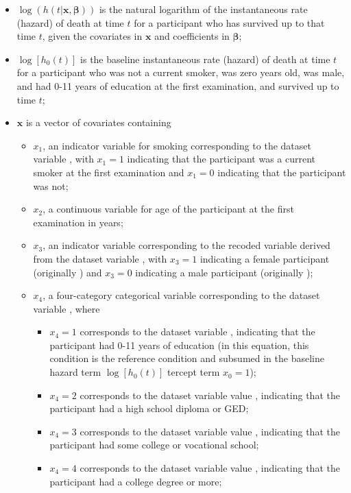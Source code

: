 \documentclass{article}\usepackage[]{graphicx}\usepackage[]{color}
\begin{document}
\begin{itemize}

  \item $ \log(h(t|\mathbf{x}, \bm{\beta})) $ is the natural logarithm of the instantaneous rate (hazard) of death at time $t$ for a participant who has survived up to that time $t$, given the covariates in $ \mathbf{x} $ and coefficients in $\bm{\beta}$;
  \item $\log[h_0(t)]$ is the baseline instantaneous rate (hazard) of death at time $t$ for a participant who was not a current smoker, was zero years old, was male, and had 0-11 years of education at the first examination, and survived up to time $t$;
  \item $\mathbf{x}$ is a vector of covariates containing
    \begin{itemize}
      \item $x_1$, an indicator variable for smoking corresponding to the dataset variable , with $x_1 = 1$ indicating that the participant was a current smoker at the first examination and $x_1 = 0$ indicating that the participant was not;
      \item $x_2$, a continuous variable for age of the participant at the first examination in years;
      \item $x_3$, an indicator variable corresponding to the recoded variable  derived from the dataset variable , with $x_3 = 1$ indicating a female participant (originally ) and $x_3 = 0$ indicating a male participant (originally );
      \item $x_4$, a four-category categorical variable corresponding to the dataset variable , where
        \begin{itemize}
          \item $x_4 = 1$ corresponds to the dataset variable , indicating that the participant had 0-11 years of education (in this equation, this condition is the reference condition and subsumed in the baseline hazard term $\log[h_0(t)]$ tercept term $x_0 = 1$);
          \item $x_4 = 2$ corresponds to the dataset variable value , indicating that the participant had a high school diploma or GED;
          \item $x_4 = 3$ corresponds to the dataset variable value , indicating that the participant had some college or vocational school;
          \item $x_4 = 4$ corresponds to the dataset variable value , indicating that the participant had a college degree or more;

\end{itemize}
\end{itemize}
\end{itemize}
\end{document}
